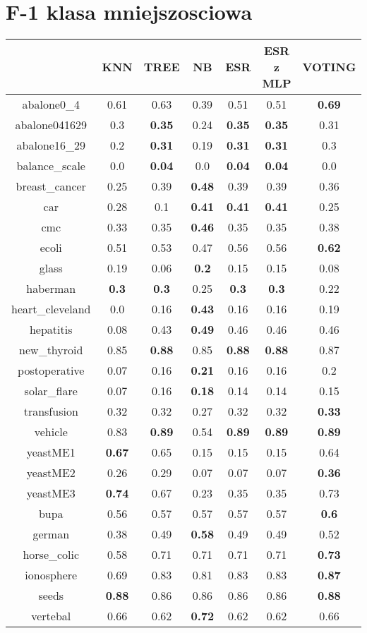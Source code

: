 \documentclass{article}%
\begin{document}
%
\section*{F{-}1 klasa mniejszosciowa}%
\begin{tabular}{c|cccccc}%
\hline%
&KNN&TREE&NB&ESR&ESR z MLP&VOTING\\%
\hline%
abalone0\_4&0.61&0.63&0.39&0.51&0.51&\textbf{0.69}\\%
\hline%
abalone041629&0.3&\textbf{0.35}&0.24&\textbf{0.35}&\textbf{0.35}&0.31\\%
\hline%
abalone16\_29&0.2&\textbf{0.31}&0.19&\textbf{0.31}&\textbf{0.31}&0.3\\%
\hline%
balance\_scale&0.0&\textbf{0.04}&0.0&\textbf{0.04}&\textbf{0.04}&0.0\\%
\hline%
breast\_cancer&0.25&0.39&\textbf{0.48}&0.39&0.39&0.36\\%
\hline%
car&0.28&0.1&\textbf{0.41}&\textbf{0.41}&\textbf{0.41}&0.25\\%
\hline%
cmc&0.33&0.35&\textbf{0.46}&0.35&0.35&0.38\\%
\hline%
ecoli&0.51&0.53&0.47&0.56&0.56&\textbf{0.62}\\%
\hline%
glass&0.19&0.06&\textbf{0.2}&0.15&0.15&0.08\\%
\hline%
haberman&\textbf{0.3}&\textbf{0.3}&0.25&\textbf{0.3}&\textbf{0.3}&0.22\\%
\hline%
heart\_cleveland&0.0&0.16&\textbf{0.43}&0.16&0.16&0.19\\%
\hline%
hepatitis&0.08&0.43&\textbf{0.49}&0.46&0.46&0.46\\%
\hline%
new\_thyroid&0.85&\textbf{0.88}&0.85&\textbf{0.88}&\textbf{0.88}&0.87\\%
\hline%
postoperative&0.07&0.16&\textbf{0.21}&0.16&0.16&0.2\\%
\hline%
solar\_flare&0.07&0.16&\textbf{0.18}&0.14&0.14&0.15\\%
\hline%
transfusion&0.32&0.32&0.27&0.32&0.32&\textbf{0.33}\\%
\hline%
vehicle&0.83&\textbf{0.89}&0.54&\textbf{0.89}&\textbf{0.89}&\textbf{0.89}\\%
\hline%
yeastME1&\textbf{0.67}&0.65&0.15&0.15&0.15&0.64\\%
\hline%
yeastME2&0.26&0.29&0.07&0.07&0.07&\textbf{0.36}\\%
\hline%
yeastME3&\textbf{0.74}&0.67&0.23&0.35&0.35&0.73\\%
\hline%
bupa&0.56&0.57&0.57&0.57&0.57&\textbf{0.6}\\%
\hline%
german&0.38&0.49&\textbf{0.58}&0.49&0.49&0.52\\%
\hline%
horse\_colic&0.58&0.71&0.71&0.71&0.71&\textbf{0.73}\\%
\hline%
ionosphere&0.69&0.83&0.81&0.83&0.83&\textbf{0.87}\\%
\hline%
seeds&\textbf{0.88}&0.86&0.86&0.86&0.86&\textbf{0.88}\\%
\hline%
vertebal&0.66&0.62&\textbf{0.72}&0.62&0.62&0.66\\%
\hline%
\end{tabular}
\end{document}
